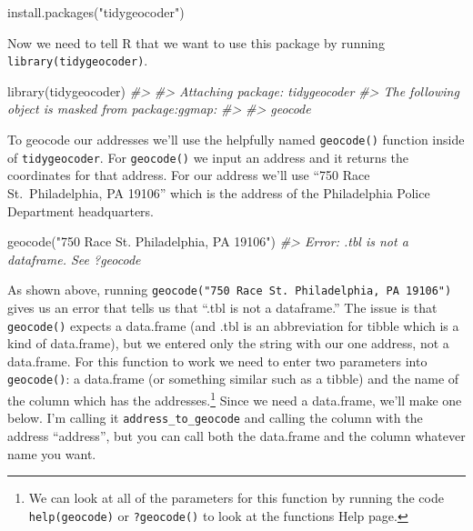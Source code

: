 \documentclass[
]{krantz}
\makeatletter
\newenvironment{Shaded}{\begin{snugshade}}{\end{snugshade}}
\newcommand{\CommentTok}[1]{\textcolor[rgb]{0.37,0.37,0.37}{\textit{#1}}}
\newcommand{\FunctionTok}[1]{\textcolor[rgb]{0,0,0}{#1}}
\newcommand{\NormalTok}[1]{#1}
\newcommand{\StringTok}[1]{\textcolor[rgb]{0.5,0.5,0.5}{#1}}
\newenvironment{kframe}{%
\medskip{}
\setlength{\fboxsep}{.8em}
 \def\at@end@of@kframe{}%
 \ifinner\ifhmode%
  \def\at@end@of@kframe{\end{minipage}}%
  \begin{minipage}{\columnwidth}%
 \fi\fi%
 \def\FrameCommand##1{\hskip\@totalleftmargin \hskip-\fboxsep
 \colorbox{shadecolor}{##1}\hskip-\fboxsep
     \hskip-\linewidth \hskip-\@totalleftmargin \hskip\columnwidth}%
 \MakeFramed {\advance\hsize-\width
   \@totalleftmargin\z@ \linewidth\hsize
   \@setminipage}}%
 {\par\unskip\endMakeFramed%
 \at@end@of@kframe}
\renewenvironment{Shaded}{\begin{kframe}}{\end{kframe}}
\makeatother
\begin{document}
\begin{Shaded}
\begin{Highlighting}[]
\FunctionTok{install.packages}\NormalTok{(}\StringTok{"tidygeocoder"}\NormalTok{)}
\end{Highlighting}
\end{Shaded}

Now we need to tell R that we want to use this package by running \texttt{library(tidygeocoder)}.

\begin{Shaded}
\begin{Highlighting}[]
\FunctionTok{library}\NormalTok{(tidygeocoder)}
\CommentTok{\#\textgreater{} }
\CommentTok{\#\textgreater{} Attaching package: \textquotesingle{}tidygeocoder\textquotesingle{}}
\CommentTok{\#\textgreater{} The following object is masked from \textquotesingle{}package:ggmap\textquotesingle{}:}
\CommentTok{\#\textgreater{} }
\CommentTok{\#\textgreater{}     geocode}
\end{Highlighting}
\end{Shaded}

To geocode our addresses we'll use the helpfully named \texttt{geocode()} function inside of \texttt{tidygeocoder}. For \texttt{geocode()} we input an address and it returns the coordinates for that address. For our address we'll use ``750 Race St.~Philadelphia, PA 19106'' which is the address of the Philadelphia Police Department headquarters.

\begin{Shaded}
\begin{Highlighting}[]
\FunctionTok{geocode}\NormalTok{(}\StringTok{"750 Race St. Philadelphia, PA 19106"}\NormalTok{)}
\CommentTok{\#\textgreater{} Error: .tbl is not a dataframe. See ?geocode}
\end{Highlighting}
\end{Shaded}

As shown above, running \texttt{geocode("750\ Race\ St.\ Philadelphia,\ PA\ 19106")} gives us an error that tells us that ``.tbl is not a dataframe.'' The issue is that \texttt{geocode()} expects a data.frame (and .tbl is an abbreviation for tibble which is a kind of data.frame), but we entered only the string with our one address, not a data.frame. For this function to work we need to enter two parameters into \texttt{geocode()}: a data.frame (or something similar such as a tibble) and the name of the column which has the addresses.\footnote{We can look at all of the parameters for this function by running the code \texttt{help(geocode)} or \texttt{?geocode()} to look at the functions Help page.} Since we need a data.frame, we'll make one below. I'm calling it \texttt{address\_to\_geocode} and calling the column with the address ``address'', but you can call both the data.frame and the column whatever name you want.
\end{document}
